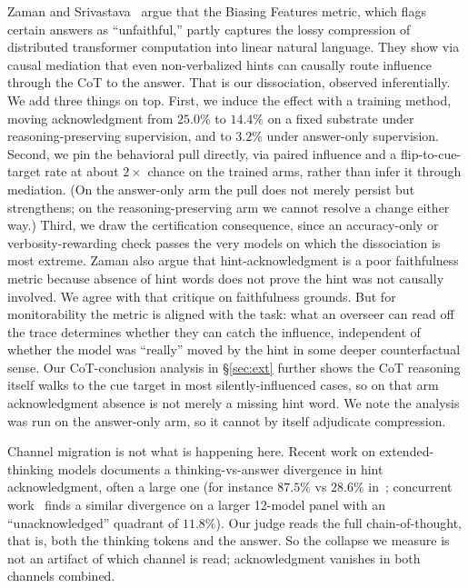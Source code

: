 \documentclass{article}
\begin{document}
Zaman and Srivastava~\cite{zaman2025} argue that the Biasing Features metric,
which flags certain answers as ``unfaithful,'' partly captures the lossy
compression of distributed transformer computation into linear natural
language. They show via causal mediation that even non-verbalized hints can
causally route influence through the CoT to the answer. That is our
dissociation, observed inferentially. We add three things on top. First, we
induce the effect with a training method, moving acknowledgment from $25.0\%$
to $14.4\%$ on a fixed substrate under reasoning-preserving supervision, and to
$3.2\%$ under answer-only supervision. Second, we pin the behavioral pull
directly, via paired influence and a flip-to-cue-target rate at about
$2\times$ chance on the trained arms, rather than infer it through mediation.
(On the answer-only arm the pull does not merely persist but strengthens; on the
reasoning-preserving arm we cannot resolve a change either way.) Third, we draw the
certification consequence, since an accuracy-only or verbosity-rewarding check
passes the very models on which the dissociation is most extreme. Zaman also
argue that hint-acknowledgment is a poor faithfulness metric because absence
of hint words does not prove the hint was not causally involved. We agree
with that critique on faithfulness grounds. But for monitorability the
metric is aligned with the task: what an overseer can read off the trace
determines whether they can catch the influence, independent of whether the
model was ``really'' moved by the hint in some deeper counterfactual sense.
Our CoT-conclusion analysis in \S\ref{sec:ext} further shows the CoT reasoning
itself walks to the cue target in most silently-influenced cases, so on that arm
acknowledgment absence is not merely a missing hint word. We note the analysis
was run on the answer-only arm, so it cannot by itself adjudicate compression.

Channel migration is not what is happening here. Recent work on
extended-thinking models documents a thinking-vs-answer divergence in hint
acknowledgment, often a large one (for instance $87.5\%$ vs $28.6\%$
in~\cite{thinkanswer2026}; concurrent work~\cite{young2026know} finds a
similar divergence on a larger 12-model panel with an ``unacknowledged''
quadrant of $11.8\%$). Our judge reads the full chain-of-thought, that is,
both the thinking tokens and the answer. So the collapse we measure is not an
artifact of which channel is read; acknowledgment vanishes in both channels
combined.
\end{document}
